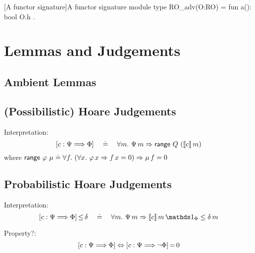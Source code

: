 \begin{easycrypt}[label={lst:functorsig}]{[A functor signature]A functor signature}
module type RO_adv(O:RO) = {
  fun a(): bool { O.h }
}.
\end{easycrypt}

\section{Lemmas and Judgements}


\subsection{Ambient Lemmas}

\subsection{(Possibilistic) Hoare Judgements}

Interpretation:
\begin{displaymath}
\left[{c}:{\Psi}\Longrightarrow{\Phi}\right]
\quad\doteq\quad
\forall m.~ \Psi\,m \Rightarrow \mathsf{range}~{Q}~{(}[\![ c ]\!]\,m)
\end{displaymath}
%
where $\mathsf{range}~{\varphi}~{\mu} \doteq \forall f.~ (\forall x.~ \varphi\,x
\Rightarrow f\,x=0) \Rightarrow \mu\,f=0$




\subsection{Probabilistic Hoare Judgements}

Interpretation:
\begin{displaymath}
\bdHoareSle{c}{\pre}{\post}{\delta} 
\quad\doteq\quad
\forall m.~ \pre\,m \Rightarrow [\![ c ]\!]\,m\,\charfun_\post \leq
\delta\,m
\end{displaymath}

Property?:
\begin{displaymath}
\left[{c}:{\Psi}\Longrightarrow{\Phi}\right]
\Leftrightarrow
{\left[{c}:{\Psi}\Longrightarrow{\neg\Phi}\right]}\,{=}\,{0}
\end{displaymath}

